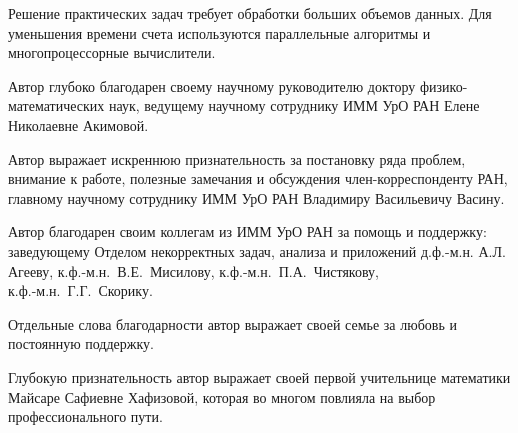 \intro

%
%

\actualitysection
\actualitytext

Решение практических задач требует обработки больших объемов данных. Для уменьшения времени счета используются параллельные алгоритмы и многопроцессорные вычислители.


\developmentsection
\developmenttext

\objectivesection
\objectivetext

\methodssection
\methodstext

\noveltysection
\noveltytext

{}


\approbationsection
\approbationtext

\pubsection
\pubtext

\contribsection
\contribtext

\structsection
\structtext
\newpage

Автор глубоко благодарен своему научному руководителю доктору физико-математических наук, ведущему научному сотруднику ИММ УрО РАН Елене Николаевне Акимовой.

Автор выражает искреннюю признательность за постановку ряда проблем, внимание к работе, полезные замечания и обсуждения член-корреспонденту РАН, главному научному сотруднику ИММ УрО РАН Владимиру Васильевичу Васину.

Автор благодарен своим коллегам из ИММ УрО РАН за помощь и поддержку: заведующему Отделом некорректных задач, анализа и приложений д.ф.-м.н. А.Л. Агееву, к.ф.-м.н.~В.Е.~Мисилову, к.ф.-м.н.~П.А.~Чистякову, \\к.ф.-м.н.~Г.Г.~Скорику.

Отдельные слова благодарности автор выражает своей семье за любовь и постоянную поддержку.

Глубокую признательность автор выражает своей первой учительнице математики Майсаре Сафиевне Хафизовой, которая во многом повлияла на выбор профессионального пути.


